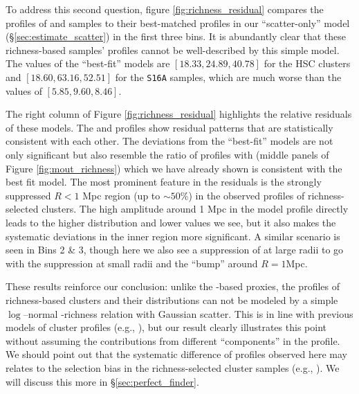 \documentclass[fleqn,usenatbib,useAMS,english]{mnras}
\begin{document}
    To address this second question, figure \ref{fig:richness_residual} compares the \dsigma{}
    profiles of \redm{} and \camira{} samples to their best-matched profiles in our
    ``scatter-only'' model (\S \ref{sec:estimate_scatter}) in the first three \topn{} bins.
    It is abundantly clear that these richness-based samples' \dsigma{} profiles cannot be
    well-described by this simple model.
    The \chisq{} values of the ``best-fit'' models are $[18.33, 24.89,
    40.78]$ for the HSC \redm{} clusters and $[18.60, 63.16, 52.51]$ for the \camira{}
    \texttt{S16A} samples, which are much worse than the  values of
    $[5.85, 9.60, 8.46]$.

    The right column of Figure \ref{fig:richness_residual} highlights the relative residuals
    of these models.
    The \redm{} and \camira{} profiles show residual patterns that are statistically
    consistent with each other.
    The deviations from the ``best-fit'' models are not only significant but also resemble
    the ratio of \dsigma{} profiles with  (middle panels of Figure
    \ref{fig:mout_richness}) which we have already shown is consistent with the best fit model.
    The most prominent feature in the residuals is the strongly suppressed $R < 1$ Mpc
    region (up to $\sim 50$\%) in the observed \dsigma{} profiles of richness-selected
    clusters.
    The high amplitude around 1 Mpc in the model \dsigma{} profile directly leads to the higher
    \mvir{} distribution and lower \sigmvir{} values we see, but it also makes the systematic 
    deviations in the inner region more significant.
    A similar scenario is seen in Bins 2 \& 3, though here we also see a suppression of \dsigma{}
    at large radii to go with the suppression at small radii and the ``bump'' around $R = 1$Mpc.

    These results reinforce our conclusion: unlike the \mstar{}-based \mvir{} proxies,
    the \dsigma{} profiles of richness-based clusters and their \mvir{} distributions can not
    be modeled by a simple $\log$--normal \mvir{}-richness relation with Gaussian scatter.
    This is in line with previous models of cluster \dsigma{} profiles (e.g.,
    \citealt{Melchior2017, Murata2018, McClintock2019}), but our result clearly illustrates
    this point without assuming the contributions from different ``components'' in the \dsigma{}
    profile.
    We should point out that the systematic difference of \dsigma{} profiles observed here may 
    relates to the selection bias in the richness-selected cluster samples 
    (e.g., \citealt{Sunayama2020, DES2020}).
    We will discuss this more in \S \ref{sec:perfect_finder}.
\end{document}
